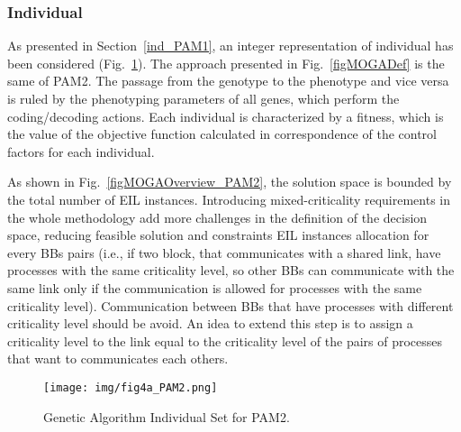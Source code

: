 \subsubsection{Individual}
As presented in Section~\ref{ind_PAM1}, an integer representation of individual has been considered (Fig.~\ref{fig3_PAM2}). The approach presented in Fig.~\ref{figMOGADef} is the same of PAM2. The passage from the genotype to the phenotype and vice versa is ruled by the phenotyping parameters of all genes, which perform the coding/decoding actions. Each individual is characterized by a fitness, which is the value of the objective function calculated in correspondence of the control factors for each individual. \par
As shown in Fig.~\ref{figMOGAOverview_PAM2}, the solution space is bounded by the total number of EIL instances. Introducing mixed-criticality requirements in the whole methodology add more challenges in the definition of the decision space, reducing feasible solution and constraints EIL instances allocation for every BBs pairs (i.e., if two block, that communicates with a shared link, have processes with the same criticality level, so other BBs can communicate with the same link only if the communication is allowed for processes with the same criticality level). Communication between BBs that have processes with different criticality level should be avoid. An idea to extend this step is to assign a criticality level to the link equal to the criticality level of the pairs of processes that want to communicates each others. 
%
\begin{figure}[htbp!]
	\centerline{\texttt{[image: img/fig4a\_PAM2.png]}}
	\caption{Genetic Algorithm Individual Set for PAM2.}
	\label{fig3_PAM2}
\end{figure}
%
